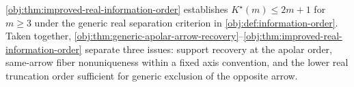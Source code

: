\cref{obj:thm:improved-real-information-order} establishes \(K^\star(m)\le 2m+1\) for \(m\ge3\) under the generic real separation criterion in \cref{obj:def:information-order}. Taken together, \cref{obj:thm:generic-apolar-arrow-recovery}--\cref{obj:thm:improved-real-information-order} separate three issues: support recovery at the apolar order, same-arrow fiber nonuniqueness within a fixed axis convention, and the lower real truncation order sufficient for generic exclusion of the opposite arrow.
